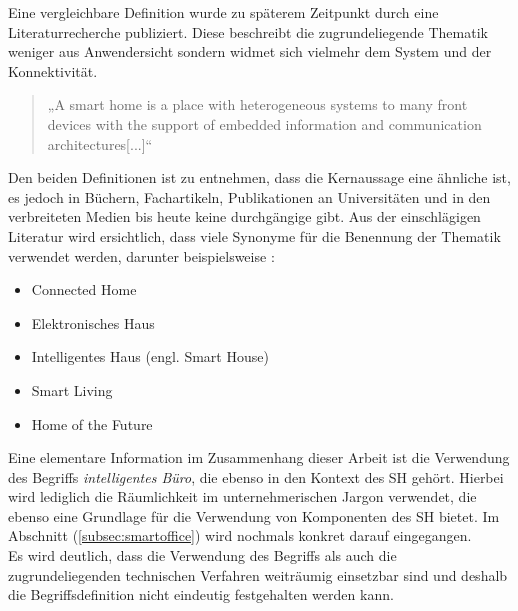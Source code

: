     Eine vergleichbare Definition wurde zu späterem Zeitpunkt durch eine Literaturrecherche publiziert. Diese beschreibt 
    die zugrundeliegende Thematik weniger aus Anwendersicht sondern widmet sich vielmehr dem System und der Konnektivität. 
    \begin{quote}
        „A smart home is a place with heterogeneous systems to many
        front devices with the support of embedded information and
        communication architectures[...]“ \cite{Balakrishnan2018}
    \end{quote}
    Den beiden Definitionen ist zu entnehmen, dass die Kernaussage eine ähnliche ist, es jedoch in Büchern, Fachartikeln, 
    Publikationen an Universitäten und in den verbreiteten Medien bis heute keine durchgängige gibt. Aus der 
    einschlägigen Literatur wird ersichtlich, dass viele Synonyme für die Benennung der Thematik verwendet werden, darunter 
    beispielsweise \cite{strese.2010m}:
    \\
    \linebreak
    \linebreak
    \begin{itemize}
        \item Connected Home
        \item Elektronisches Haus
        \item Intelligentes Haus (engl. Smart House)
        \item Smart Living
        \item Home of the Future 
    \end{itemize}
    Eine elementare Information im Zusammenhang dieser Arbeit ist die Verwendung des Begriffs \textit{intelligentes Büro}, die 
    ebenso in den Kontext des \acl{SH} gehört. Hierbei wird lediglich die Räumlichkeit im unternehmerischen Jargon verwendet, 
    die ebenso eine Grundlage für die Verwendung von Komponenten des \acl{SH} bietet. Im Abschnitt (\ref{subsec:smartoffice}) wird 
    nochmals konkret darauf eingegangen.
    \\
    Es wird deutlich, dass die Verwendung des Begriffs als auch die zugrundeliegenden technischen Verfahren 
    weiträumig einsetzbar sind und deshalb die Begriffsdefinition nicht eindeutig festgehalten werden kann. 
    
